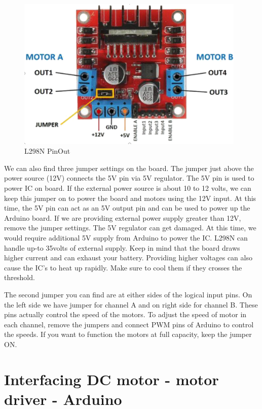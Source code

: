 \begin{figure}
    \centering
    \includegraphics[width=4.3in]{Images/Motor_Driver/pin_description.png}
    \caption{L298N PinOut}
\end{figure}
We can also find three jumper settings on the board. The jumper just above the power source (12V) connects the 5V pin via 5V regulator. The 5V pin is used to power \ac{IC} on board. If the external power source is about 10 to 12 volts, we can keep this jumper on to power the board and motors using the 12V input. At this time, the 5V pin can act as an 5V output pin and can be used to power up the Arduino board. If we are providing external power supply greater than 12V, remove the jumper settings. The 5V regulator can get damaged. At this time, we would require additional 5V supply from Arduino to power the \ac{IC}. L298N can handle up-to 35volts of external supply. Keep in mind that the board draws higher current and can exhaust your battery. Providing higher voltages can also cause the \ac{IC}’s to heat up rapidly. Make sure to cool them if they crosses the threshold.

\par The second jumper you can find are at either sides of the logical input pins. On the left side we have jumper for channel A and on right side for channel B. These pins actually control the speed of the motors. To adjust the speed of motor in each channel, remove the jumpers and connect \ac{PWM} pins of Arduino to control the speeds. If you want to function the motors at full capacity, keep the jumper ON.

\section{Interfacing DC motor - motor driver - Arduino}
\label{section:bot_interface}

